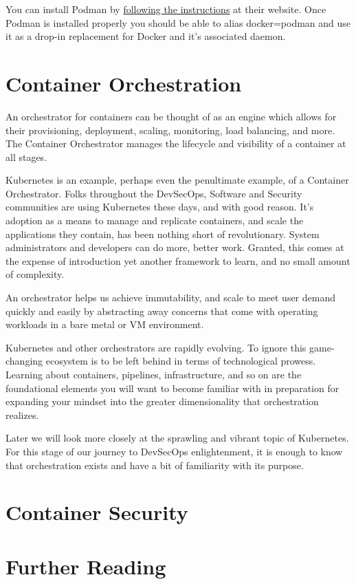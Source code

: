 \justify{}
You can install Podman by 
\href{https://podman.io/getting-started/installation.html}{following the instructions}
at their website. Once Podman is installed properly you
should be able to alias docker=podman and use it as a
drop-in replacement for Docker and it's associated daemon.

\section{Container Orchestration}
\justify{}
An orchestrator for containers can be thought of as an engine which
allows for their provisioning, deployment, scaling, monitoring, load
balancing, and more. The Container Orchestrator manages the
lifecycle and visibility of a container at all stages.

\justify{}
Kubernetes is an example, perhaps even the
penultimate example, of a Container Orchestrator.
Folks throughout the DevSecOps, Software and
Security communities are using Kubernetes these days, and
with good reason. It's adoption as a means to manage and
replicate containers, and scale the applications they contain,
has been nothing short of revolutionary. System administrators
and developers can do more, better work. Granted, this comes at
the expense of introduction yet another framework to learn, and
no small amount of complexity.

\justify{}
An orchestrator helps us achieve immutability, and scale
to meet user demand quickly and easily by abstracting away
concerns that come with operating workloads in a bare metal
or VM environment.

\justify{}
Kubernetes and other orchestrators are rapidly evolving. To ignore this
game-changing ecosystem is to be left behind in terms of technological
prowess. Learning about containers, pipelines, infrastructure, and
so on are the foundational elements you will want to become familiar
with in preparation for expanding your mindset into the greater
dimensionality that orchestration realizes.

\justify{}
Later we will look more closely at the sprawling and vibrant 
topic of Kubernetes. For this stage of our journey to DevSecOps
enlightenment, it is enough to know that orchestration exists
and have a bit of familiarity with its purpose.

\section{Container Security}

\section{Further Reading}

